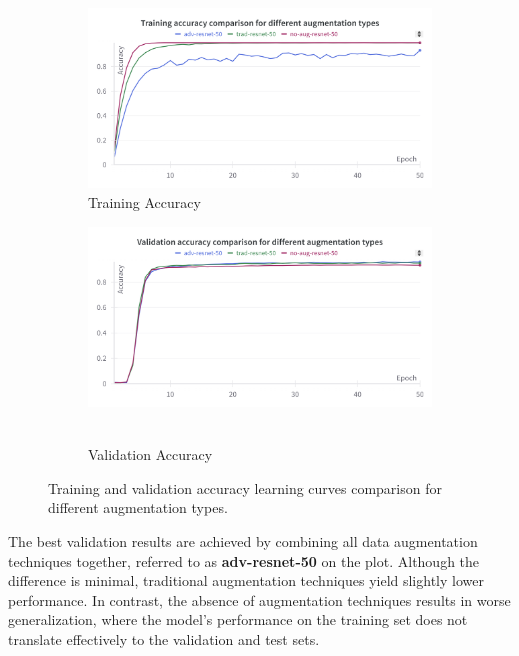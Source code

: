 \begin{figure}[!htb]
    \centering
    \begin{subfigure}{0.95\textwidth}
        \includegraphics[width=\textwidth]{Images/flowers-results/Learning-Curves-Train-Aug-Comparison.png}
        \caption{Training Accuracy}
    \end{subfigure}
    \vspace{0.3cm}

    \begin{subfigure}{0.95\textwidth}
        \includegraphics[width=\textwidth]{Images/flowers-results/Learning-Curves-Val-Aug-Comparison.png}\
        \caption{Validation Accuracy}
    \end{subfigure}
    \vspace{0.3cm}
    \caption{Training and validation accuracy learning curves comparison for different augmentation types.}
    \label{fig:flowersLCAugComparison}
\end{figure}

The best validation results are achieved by combining all data augmentation techniques together, referred to as \textbf{adv-resnet-50} on the plot. Although the difference is minimal, traditional augmentation techniques yield slightly lower performance. In contrast, the absence of augmentation techniques results in worse generalization, where the model's performance on the training set does not translate effectively to the validation and test sets.

